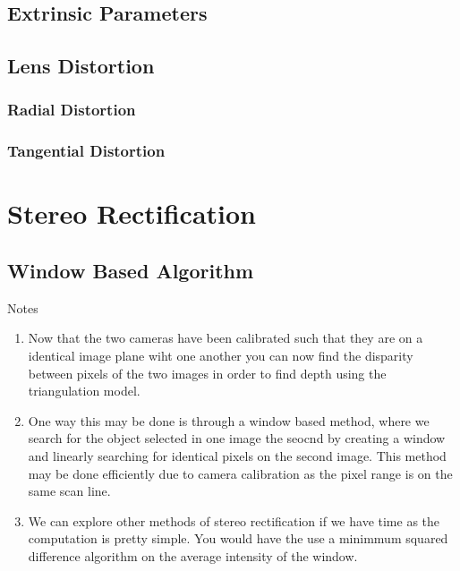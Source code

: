 \documentclass[11pt]{scrartcl}
\begin{document}
\begin{remark}
\subsection{Extrinsic Parameters}

\subsection{Lens Distortion}

    \subsubsection{Radial Distortion}
    \subsubsection{Tangential Distortion}

    
\end{remark}

\section{Stereo Rectification}

\subsection{Window Based Algorithm}
\begin{remark}
    Notes{\begin{enumerate}
        \item Now that the two cameras have been calibrated such that they are on a identical image plane wiht one another you can now find the disparity between pixels of the two images in order to find depth using the triangulation model. 
        \item One way this may be done is through a window based method, where we search for the object selected in one image the seocnd by creating a window and linearly searching for identical pixels on the second image. This method may be done efficiently due to camera calibration as the pixel range is on the same scan line. 
        \item We can explore other methods of stereo rectification if we have time as the computation is pretty simple. You would have the use
            a minimmum squared difference algorithm on the average intensity of the window. 
    \end{enumerate}} %
    \label{par:Notes}
    
\end{remark}
\end{document}
